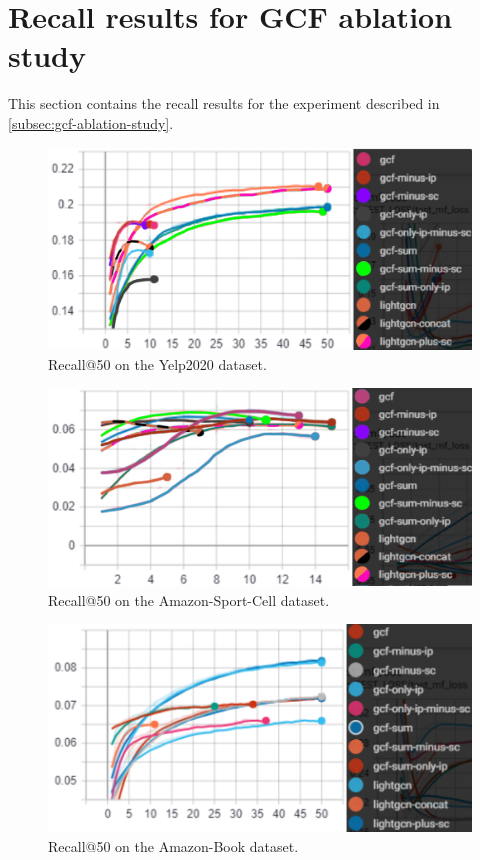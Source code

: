 \section{Recall results for GCF ablation study}\label{app:recall-results-gcf-ablation}
This section contains the recall results for the experiment described in \autoref{subsec:gcf-ablation-study}.
\begin{figure}[h!]
    \includegraphics[width=\linewidth]{figures/gcf-all-recall.png}
    \caption{Recall@50 on the Yelp2020 dataset.}
    \label{fig:GCF-recall-ablation-study}
\end{figure}
\begin{figure}[]
    \includegraphics[width=\linewidth]{figures/amazon-cell-sport-gcf-all-recall.png}
    \caption{Recall@50 on the Amazon-Sport-Cell dataset.}
    \label{fig:GCF-recall-ablation-study-amazon-cell-sport}
\end{figure}
\begin{figure}[]
    \includegraphics[width=\linewidth]{figures/amazon-book-gcf-all-recall.png}
    \caption{Recall@50 on the Amazon-Book dataset.}
    \label{fig:GCF-recall-ablation-study-amazon-book}
\end{figure}
